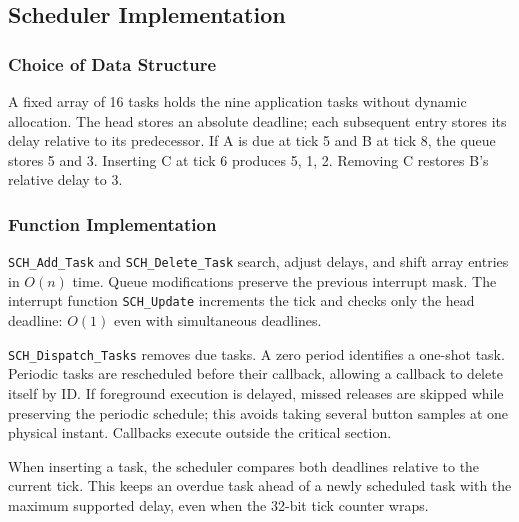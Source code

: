 \subsection{Scheduler Implementation}
\subsubsection{Choice of Data Structure}
A fixed array of 16 tasks holds the nine application tasks without dynamic allocation. The head stores an absolute deadline; each subsequent entry stores its delay relative to its predecessor. If A is due at tick 5 and B at tick 8, the queue stores 5 and 3. Inserting C at tick 6 produces 5, 1, 2. Removing C restores B's relative delay to 3.

\subsubsection{Function Implementation}
\texttt{SCH\_Add\_Task} and \texttt{SCH\_Delete\_Task} search, adjust delays, and shift array entries in $O(n)$ time. Queue modifications preserve the previous interrupt mask. The interrupt function \texttt{SCH\_Update} increments the tick and checks only the head deadline: $O(1)$ even with simultaneous deadlines.

\texttt{SCH\_Dispatch\_Tasks} removes due tasks. A zero period identifies a one-shot task. Periodic tasks are rescheduled before their callback, allowing a callback to delete itself by ID. If foreground execution is delayed, missed releases are skipped while preserving the periodic schedule; this avoids taking several button samples at one physical instant. Callbacks execute outside the critical section.

When inserting a task, the scheduler compares both deadlines relative to the current tick. This keeps an overdue task ahead of a newly scheduled task with the maximum supported delay, even when the 32-bit tick counter wraps.
